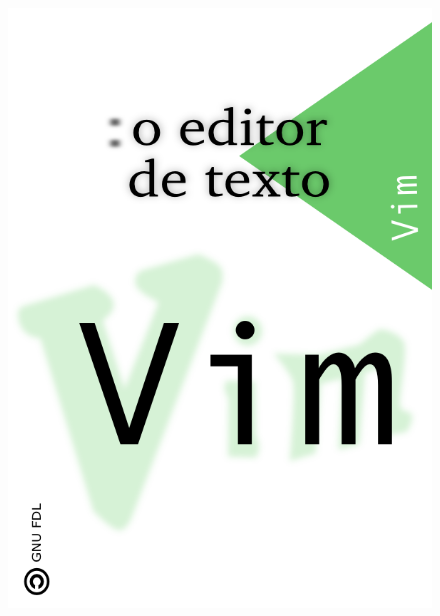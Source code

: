 \documentclass[10pt,a4paper,openany]{book}
\begin{document}

\thispagestyle{empty}
\begin{figure}[htp]
    \centering
    \includegraphics[bb=100 0 500 716]{img/capa.png}
\end{figure}
\clearpage
\end{document}
